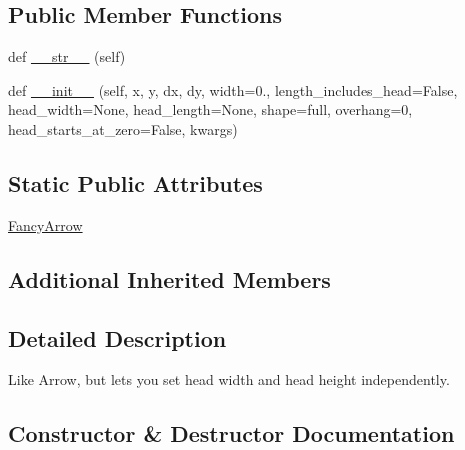 \subsection*{Public Member Functions}
\begin{DoxyCompactItemize}
\item 
def \hyperlink{classmatplotlib_1_1patches_1_1FancyArrow_a944417d81fdb428a16f945a61c4ded0a}{\+\_\+\+\_\+str\+\_\+\+\_\+} (self)
\item 
def \hyperlink{classmatplotlib_1_1patches_1_1FancyArrow_aa2e1f352b69408337eade8769110b8b3}{\+\_\+\+\_\+init\+\_\+\+\_\+} (self, x, y, dx, dy, width=0., length\+\_\+includes\+\_\+head=False, head\+\_\+width=None, head\+\_\+length=None, shape=\textquotesingle{}full\textquotesingle{}, overhang=0, head\+\_\+starts\+\_\+at\+\_\+zero=False, kwargs)
\end{DoxyCompactItemize}
\subsection*{Static Public Attributes}
\begin{DoxyCompactItemize}
\item 
\hyperlink{classmatplotlib_1_1patches_1_1FancyArrow_a5813820b87de7e6ef31b84fa4d77d856}{Fancy\+Arrow}
\end{DoxyCompactItemize}
\subsection*{Additional Inherited Members}


\subsection{Detailed Description}
\begin{DoxyVerb}Like Arrow, but lets you set head width and head height independently.
\end{DoxyVerb}
 

\subsection{Constructor \& Destructor Documentation}
\mbox{\label{classmatplotlib_1_1patches_1_1FancyArrow_aa2e1f352b69408337eade8769110b8b3}} 
